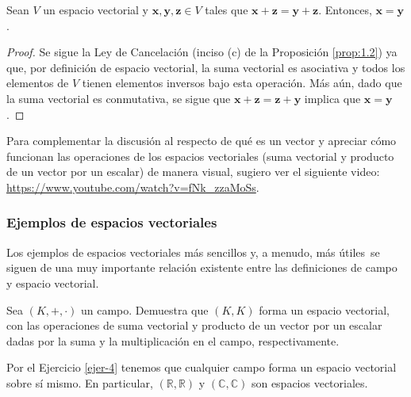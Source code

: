 \documentclass[apuntes]{subfiles}
\begin{document}
\begin{coro}\label{coro:1.6}
Sean $V$ un espacio vectorial y $\mathbf{x},\mathbf{y},\mathbf{z}\in V$ tales que $\mathbf{x}+\mathbf{z}=\mathbf{y}+\mathbf{z}$. Entonces, $\mathbf{x}=\mathbf{y}$.

\begin{proof}

    Se sigue la Ley de Cancelación (inciso (c) de la Proposición \ref{prop:1.2}) ya que, por definición de espacio vectorial, la suma vectorial es asociativa y todos los elementos de $V$ tienen elementos inversos bajo esta operación. Más aún, dado que la suma vectorial es conmutativa, se sigue que $\mathbf{x}+\mathbf{z} = \mathbf{z}+\mathbf{y}$ implica que $\mathbf{x}=\mathbf{y}$.
\end{proof}
\end{coro}

Para complementar la discusión al respecto de qué es un vector y apreciar cómo funcionan las operaciones de los espacios vectoriales (suma vectorial y producto de un vector por un escalar) de manera visual, sugiero ver el siguiente video: \url{https://www.youtube.com/watch?v=fNk_zzaMoSs}.

\subsubsection*{Ejemplos de espacios vectoriales} \label{Ejem:Espacios_vectoriales}

Los ejemplos de espacios vectoriales más sencillos \textemdash y, a menudo, más útiles\textemdash \ se siguen de una muy importante relación existente entre las definiciones de campo y espacio vectorial.

\begin{ejer}\label{ejer-4}
    
    Sea $(K,+,\cdot)$ un campo. Demuestra que $(K,K)$ forma un espacio vectorial, con las operaciones de suma vectorial y producto de un vector por un escalar dadas por la suma y la multiplicación en el campo, respectivamente.
\end{ejer}

Por el Ejercicio \ref{ejer-4} tenemos que cualquier campo forma un espacio vectorial sobre sí mismo. En particular, $(\mathbb{R},\mathbb{R})$ y $(\mathbb{C},\mathbb{C})$ son espacios vectoriales. \\ %

%    
\end{document}
